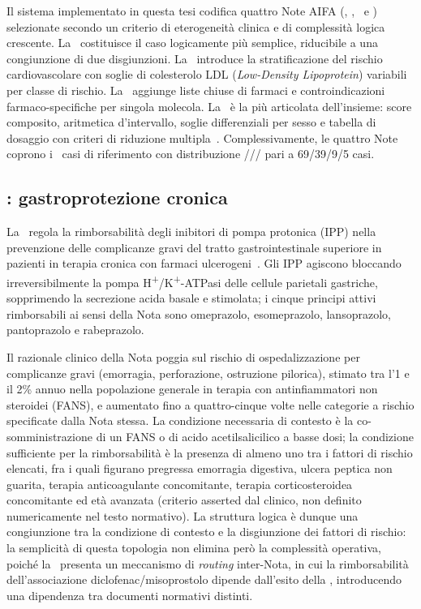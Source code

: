 Il sistema implementato in questa tesi codifica quattro Note AIFA
(\notezero, \notetredici, \notesessanta\ e \notenova) selezionate
secondo un criterio di eterogeneità clinica e di complessità logica crescente.
La \notezero\ costituisce il caso logicamente più semplice, riducibile a una
congiunzione di due disgiunzioni.
La \notetredici\ introduce la stratificazione del rischio cardiovascolare con
soglie di colesterolo LDL (\emph{Low-Density Lipoprotein}) variabili per classe di rischio.
La \notesessanta\ aggiunge liste chiuse di farmaci e controindicazioni
farmaco-specifiche per singola molecola.
La \notenova\ è la più articolata dell'insieme: score composito, aritmetica
d'intervallo, soglie differenziali per sesso e tabella di dosaggio con criteri
di riduzione multipla~\cite{aifa2024note}.
Complessivamente, le quattro Note coprono i \goldn\ casi di riferimento con distribuzione
///
pari a 69/39/9/5 casi.

\subsection{\notezero: gastroprotezione cronica}
\label{subsec:nota01}

La \notezero\ regola la rimborsabilità degli inibitori di pompa protonica (IPP)
nella prevenzione delle complicanze gravi del tratto gastrointestinale superiore
in pazienti in terapia cronica con farmaci ulcerogeni~\cite{nota01aifa}.
Gli IPP agiscono bloccando irreversibilmente la pompa
H\textsuperscript{+}/K\textsuperscript{+}-ATPasi delle cellule parietali gastriche,
sopprimendo la secrezione acida basale e stimolata; i cinque principi attivi
rimborsabili ai sensi della Nota sono omeprazolo, esomeprazolo, lansoprazolo,
pantoprazolo e rabeprazolo.

Il razionale clinico della Nota poggia sul rischio di ospedalizzazione per
complicanze gravi (emorragia, perforazione, ostruzione pilorica), stimato tra
l'1 e il 2\% annuo nella popolazione generale in terapia con antinfiammatori non steroidei (FANS), e aumentato
fino a quattro-cinque volte nelle categorie a rischio specificate dalla Nota stessa.
La condizione necessaria di contesto è la co-somministrazione di un FANS o di
acido acetilsalicilico a basse dosi; la condizione sufficiente per la rimborsabilità
è la presenza di almeno uno tra i fattori di rischio elencati, fra i quali figurano
pregressa emorragia digestiva, ulcera peptica non guarita, terapia anticoagulante
concomitante, terapia corticosteroidea concomitante ed età avanzata (criterio
asserted dal clinico, non definito numericamente nel testo normativo).
La struttura logica è dunque una congiunzione tra la condizione di contesto e
la disgiunzione dei fattori di rischio: la semplicità di questa topologia non
elimina però la complessità operativa, poiché la \notezero\ presenta un
meccanismo di \emph{routing} inter-Nota, in cui la rimborsabilità dell'associazione
diclofenac/misoprostolo dipende dall'esito della \notesessanta, introducendo
una dipendenza tra documenti normativi distinti.

